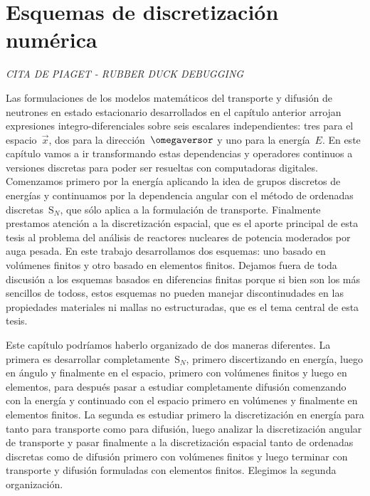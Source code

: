 \chapter{Esquemas de discretización numérica}
\label{cap:esquemas}

\begin{chapterquote}[0.87\linewidth]
\smallskip
\textit{CITA DE PIAGET - RUBBER DUCK DEBUGGING}
\end{chapterquote}

\noindent
Las formulaciones de los modelos matemáticos del transporte y difusión de neutrones en estado estacionario desarrollados en el capítulo anterior arrojan expresiones integro-diferenciales sobre seis escalares independientes: tres para el espacio~$\vec{x}$, dos para la dirección~$\omegaversor$ y uno para la energía~$E$. En este capítulo vamos a ir transformando estas dependencias y operadores continuos a versiones discretas para poder ser resueltas con computadoras digitales. Comenzamos primero por la energía aplicando la idea de grupos discretos de energías y continuamos por la dependencia angular con el método de ordenadas discretas~S$_N$, que sólo aplica a la formulación de transporte. Finalmente prestamos atención a la discretización espacial, que es el aporte principal de esta tesis al problema del análisis de reactores nucleares de potencia moderados por auga pesada. En este trabajo desarrollamos dos esquemas: uno basado en volúmenes finitos y otro basado en elementos finitos. Dejamos fuera de toda discusión a los esquemas basados en diferencias finitas porque si bien son los más sencillos de todoss, estos esquemas no pueden manejar discontinudades en las propiedades materiales ni mallas no estructuradas, que es el tema central de esta tesis.

Este capítulo podríamos haberlo organizado de dos maneras diferentes. La primera es desarrollar completamente~S$_N$, primero discertizando en energía, luego en ángulo y finalmente en el espacio, primero con volúmenes finitos y luego en elementos, para después pasar a estudiar completamente difusión comenzando con la energía y continuado con el espacio primero en volúmenes y finalmente en elementos finitos. La segunda es estudiar primero la discretización en energía para tanto para transporte como para difusión, luego analizar la discretización angular de transporte y pasar finalmente a la discretización espacial tanto de ordenadas discretas como de difusión primero con volúmenes finitos y luego terminar con transporte y difusión formuladas con elementos finitos. Elegimos la segunda organización.

